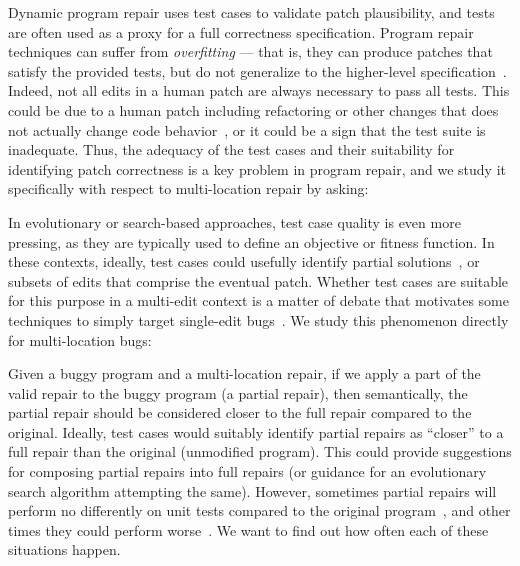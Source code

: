 \documentclass[10pt, conference]{IEEEtran}
\begin{document}
Dynamic program repair uses test cases to validate patch plausibility, and tests are
often used as a proxy for a full correctness specification.  Program repair
techniques can suffer from \emph{overfitting} --- that is, they can produce
patches that satisfy the provided tests, but do not generalize to the
higher-level specification~\cite{Smith15fse}.  
%
Indeed, not all edits in a human patch are always necessary to pass all tests. This could be
due to a human patch including refactoring or other changes that does not actually
change code behavior~\cite{api-refactoring, tangledchanges}, or it could be a sign that the test
suite is inadequate.  
Thus, the adequacy of the test
cases and their suitability for identifying patch correctness is a key problem
in program repair, and we study it specifically with respect to multi-location
repair by asking:



In evolutionary or search-based approaches, test case quality is
even more pressing, as they are typically used to define an objective or
fitness function.  In these contexts, ideally, test cases could usefully
identify partial solutions~\cite{better-fitness}, or subsets of edits that comprise the eventual
patch. Whether test cases are suitable for this purpose in a multi-edit context
is a matter of debate that motivates some techniques to simply target
single-edit bugs~\cite{ae,rsrepair}. We study this phenomenon directly for
multi-location bugs:


Given a buggy program and a multi-location repair, if we apply a part of the valid repair to 
the buggy program (a partial repair), then semantically, the partial repair should be considered closer
 to the full repair compared to the original.
Ideally, test cases would suitably identify partial repairs as ``closer'' to a 
full repair than the original (unmodified program).
This could provide suggestions for composing partial repairs into full repairs 
(or guidance for an evolutionary search algorithm attempting the same).
However, sometimes partial repairs will perform no differently on unit tests compared
to the original program~\cite{chris-thesis, source-code-checkpoint},
and other times they could perform worse~\cite{gecco09}. We want to find
out how often each of these situations happen.
\end{document}
